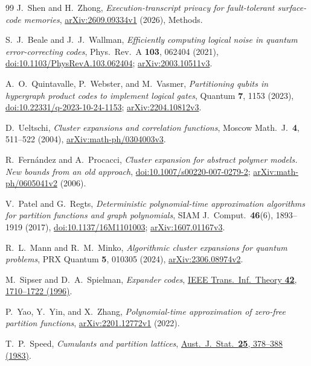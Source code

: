 \documentclass[10pt,twocolumn]{article}
\theoremstyle{definition}
\begin{document}
\begin{thebibliography}{99}
J.~Shen and H.~Zhong,
\emph{Execution-transcript privacy for fault-tolerant surface-code memories},
\href{https://arxiv.org/abs/2609.09334v1}{arXiv:2609.09334v1} (2026), Methods.

S.~J.~Beale and J.~J.~Wallman,
\emph{Efficiently computing logical noise in quantum error-correcting codes},
Phys.\ Rev.\ A \textbf{103}, 062404 (2021),
\href{https://doi.org/10.1103/PhysRevA.103.062404}{doi:10.1103/PhysRevA.103.062404};
\href{https://arxiv.org/abs/2003.10511v3}{arXiv:2003.10511v3}.

A.~O.~Quintavalle, P.~Webster, and M.~Vasmer,
\emph{Partitioning qubits in hypergraph product codes to implement logical gates},
Quantum \textbf{7}, 1153 (2023),
\href{https://doi.org/10.22331/q-2023-10-24-1153}{doi:10.22331/q-2023-10-24-1153};
\href{https://arxiv.org/abs/2204.10812v3}{arXiv:2204.10812v3}.

D.~Ueltschi,
\emph{Cluster expansions and correlation functions},
Moscow Math.\ J.\ \textbf{4}, 511--522 (2004),
\href{https://arxiv.org/abs/math-ph/0304003v3}{arXiv:math-ph/0304003v3}.

R.~Fern\'andez and A.~Procacci,
\emph{Cluster expansion for abstract polymer models. New bounds from an old approach},
\href{https://doi.org/10.1007/s00220-007-0279-2}{doi:10.1007/s00220-007-0279-2};
\href{https://arxiv.org/abs/math-ph/0605041v2}{arXiv:math-ph/0605041v2} (2006).

V.~Patel and G.~Regts,
\emph{Deterministic polynomial-time approximation algorithms for partition functions and graph polynomials},
SIAM J.\ Comput.\ \textbf{46}(6), 1893--1919 (2017),
\href{https://doi.org/10.1137/16M1101003}{doi:10.1137/16M1101003};
\href{https://arxiv.org/abs/1607.01167v3}{arXiv:1607.01167v3}.

R.~L.~Mann and R.~M.~Minko,
\emph{Algorithmic cluster expansions for quantum problems},
PRX Quantum \textbf{5}, 010305 (2024),
\href{https://arxiv.org/abs/2306.08974v2}{arXiv:2306.08974v2}.

M.~Sipser and D.~A.~Spielman,
\emph{Expander codes},
\href{https://doi.org/10.1109/18.556667}{IEEE Trans.\ Inf.\ Theory \textbf{42}, 1710--1722 (1996)}.

P.~Yao, Y.~Yin, and X.~Zhang,
\emph{Polynomial-time approximation of zero-free partition functions},
\href{https://arxiv.org/abs/2201.12772v1}{arXiv:2201.12772v1} (2022).

T.~P.~Speed, \emph{Cumulants and partition lattices},
\href{https://doi.org/10.1111/j.1467-842X.1983.tb00391.x}{Aust.\ J.\ Stat.\ \textbf{25}, 378--388 (1983)}.


\end{thebibliography}
\end{document}
